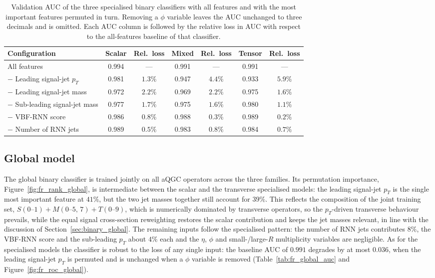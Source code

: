 \begin{table}[htbp]
  \centering
  \caption{Validation AUC of the three specialised binary classifiers with all features and with the most important features permuted in turn. Removing a $\phi$ variable leaves the AUC unchanged to three decimals and is omitted. Each AUC column is followed by the relative loss in AUC with respect to the all-features baseline of that classifier.}
  \label{tab:fr_specialised_auc}
  \begin{tabular}{|l|c|c|c|c|c|c|}
    \hline
    \textbf{Configuration} & \textbf{Scalar} & \textbf{Rel.\ loss} & \textbf{Mixed} & \textbf{Rel.\ loss} & \textbf{Tensor} & \textbf{Rel.\ loss} \\
    \hline
    All features                   & 0.994 & --- & 0.991 & --- & 0.991 & --- \\
    \hline
    $-$ Leading signal-jet $p_T$    & 0.981 & $1.3\%$ & 0.947 & $4.4\%$ & 0.933 & $5.9\%$ \\
    $-$ Leading signal-jet mass     & 0.972 & $2.2\%$ & 0.969 & $2.2\%$ & 0.975 & $1.6\%$ \\
    $-$ Sub-leading signal-jet mass & 0.977 & $1.7\%$ & 0.975 & $1.6\%$ & 0.980 & $1.1\%$ \\
    $-$ VBF-RNN score               & 0.986 & $0.8\%$ & 0.988 & $0.3\%$ & 0.989 & $0.2\%$ \\
    $-$ Number of RNN jets          & 0.989 & $0.5\%$ & 0.983 & $0.8\%$ & 0.984 & $0.7\%$ \\
    \hline
  \end{tabular}
\end{table}

\subsection{Global model}
\label{sec:fr_global}

The global binary classifier is trained jointly on all aQGC operators across the three families. Its permutation importance, Figure~\ref{fig:fr_rank_global}, is intermediate between the scalar and the transverse specialised models: the leading signal-jet $p_T$ is the single most important feature at $41\%$, but the two jet masses together still account for $39\%$. This reflects the composition of the joint training set, $S(0\text{--}1)+M(0\text{--}5,\,7)+T(0\text{--}9)$, which is numerically dominated by transverse operators, so the $p_T$-driven transverse behaviour prevails, while the equal signal cross-section reweighting restores the scalar contribution and keeps the jet masses relevant, in line with the discussion of Section~\ref{sec:binary_global}. The remaining inputs follow the specialised pattern: the number of RNN jets contributes $8\%$, the VBF-RNN score and the sub-leading $p_T$ about $4\%$ each and the $\eta$, $\phi$ and small-/large-$R$ multiplicity variables are negligible. As for the specialised models the classifier is robust to the loss of any single input: the baseline AUC of $0.991$ degrades by at most $0.036$, when the leading signal-jet $p_T$ is permuted and is unchanged when a $\phi$ variable is removed (Table~\ref{tab:fr_global_auc} and Figure~\ref{fig:fr_roc_global}).

